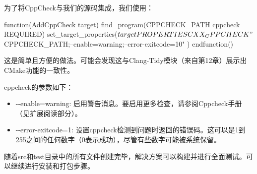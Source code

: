 为了将CppCheck与我们的源码集成，我们使用：


\begin{cmake}
function(AddCppCheck target)
    find_program(CPPCHECK_PATH cppcheck REQUIRED)
    set_target_properties(${target}
    PROPERTIES CXX_CPPCHECK
        "${CPPCHECK_PATH};--enable=warning;--error-exitcode=10"
    )
endfunction()
\end{cmake}

这是简单且方便的做法。可能会发现这与Clang-Tidy模块（来自第12章）展示出CMake功能的一致性。

cppcheck的参数如下：

\begin{itemize}
\item
-{}-enable=warning: 启用警告消息。要启用更多检查，请参阅Cppcheck手册（见扩展阅读部分）。

\item
-{}-error-exitcode=1: 设置cppcheck检测到问题时返回的错误码。这可以是1到255之间的任何数字（0表示成功），尽管有些数字可能被系统保留。
\end{itemize}

随着src和test目录中的所有文件创建完毕，解决方案可以构建并进行全面测试。可以继续进行安装和打包步骤。

































